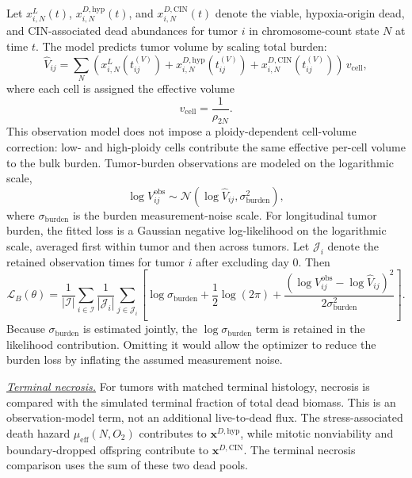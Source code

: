 \documentclass[11pt]{article}
\begin{document}
Let $x^{L}_{i,N}(t)$, $x^{D,\mathrm{hyp}}_{i,N}(t)$, and $x^{D,\mathrm{CIN}}_{i,N}(t)$ denote the viable, hypoxia-origin dead, and CIN-associated dead abundances for tumor $i$ in chromosome-count state $N$ at time $t$. The model predicts tumor volume by scaling total burden:
\begin{equation}
\widehat V_{ij}
=
\sum_{N}
\left(
x^{L}_{i,N}(t_{ij}^{(V)})
+
x^{D,\mathrm{hyp}}_{i,N}(t_{ij}^{(V)})
+
x^{D,\mathrm{CIN}}_{i,N}(t_{ij}^{(V)})
\right)
\,v_{\mathrm{cell}},
\label{eq:appendix_pred_volume}
\end{equation}
where each cell is assigned the effective volume
\begin{equation}
v_{\mathrm{cell}}
=
\frac{1}{\rho_{2N}}.
\label{eq:appendix_cell_volume_scale}
\end{equation}
This observation model does not impose a ploidy-dependent cell-volume correction: low- and high-ploidy cells contribute the same effective per-cell volume to the bulk burden.
Tumor-burden observations are modeled on the logarithmic scale,
\begin{equation}
\log V_{ij}^{\mathrm{obs}}
\sim
\mathcal N
\!\left(
\log \widehat V_{ij},
\sigma_{\mathrm{burden}}^2
\right),
\label{eq:appendix_burden_likelihood}
\end{equation}
where $\sigma_{\mathrm{burden}}$ is the burden measurement-noise scale. For longitudinal tumor burden, the fitted loss is a Gaussian negative log-likelihood on the logarithmic scale, averaged first within tumor and then across tumors. Let $\mathcal J_i$ denote the retained observation times for tumor $i$ after excluding day 0. Then
\begin{equation}
\mathcal L_B(\theta)
=
\frac{1}{|\mathcal I|}
\sum_{i\in\mathcal I}
\frac{1}{|\mathcal J_i|}
\sum_{j\in\mathcal J_i}
\left[
\log \sigma_{\mathrm{burden}}
+
\frac{1}{2}\log(2\pi)
+
\frac{
\left(
\log V_{ij}^{\mathrm{obs}}
-
\log \widehat V_{ij}
\right)^2
}{
2\sigma_{\mathrm{burden}}^2
}
\right].
\label{eq:appendix_burden_loss}
\end{equation}
Because $\sigma_{\mathrm{burden}}$ is estimated jointly, the $\log \sigma_{\mathrm{burden}}$ term is retained in the likelihood contribution. Omitting it would allow the optimizer to reduce the burden loss by inflating the assumed measurement noise.

\underline{\textit{Terminal necrosis.}} For tumors with matched terminal histology, necrosis is compared with the simulated terminal fraction of total dead biomass. This is an observation-model term, not an additional live-to-dead flux. The stress-associated death hazard $\mu_{\mathrm{eff}}(N,O_2)$ contributes to $\mathbf{x}^{D,\mathrm{hyp}}$, while mitotic nonviability and boundary-dropped offspring contribute to $\mathbf{x}^{D,\mathrm{CIN}}$. The terminal necrosis comparison uses the sum of these two dead pools.
\end{document}
